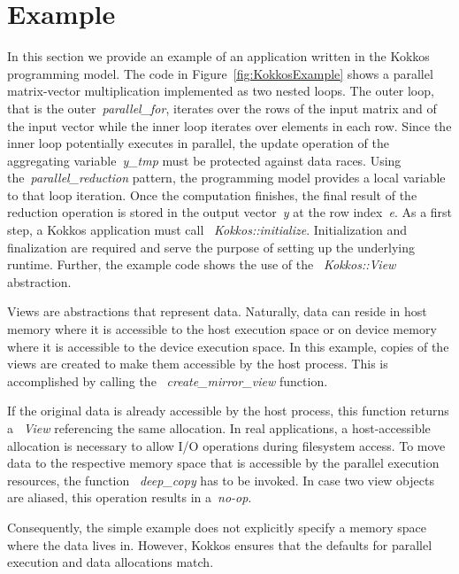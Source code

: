 \section{Example}\label{chap:kokkosExample}

In this section we provide an example of an application written in the Kokkos programming model. The code in Figure~\ref{fig:KokkosExample} shows a parallel matrix-vector multiplication implemented as two nested loops. The outer loop, that is the outer~\emph{parallel\_for}, iterates over the rows of the input matrix and of the input vector while the inner loop iterates over elements in each row. Since the inner loop potentially executes in parallel, the update operation of the aggregating variable~\emph{y\_tmp} must be protected against data races. Using the~\emph{parallel\_reduction} pattern, the programming model provides a local variable to that loop iteration. Once the computation finishes, the final result of the reduction operation is stored in the output vector~\emph{y} at the row index~\emph{e}.  
As a first step, a Kokkos application must call ~\emph{Kokkos::initialize}. Initialization and finalization are required and serve the purpose of setting up the underlying runtime. 
Further, the example code shows the use of the ~\emph{Kokkos::View} abstraction. 

Views are abstractions that represent data. Naturally, data can reside in host memory where it is accessible to the host execution space or on device memory where it is accessible to the device execution space. In this example, copies of the views are created to make them accessible by the host process. This is accomplished by calling the ~\emph{create\_mirror\_view} function. 

If the original data is already accessible by the host process, this function returns a ~\emph{View} referencing the same allocation. In real applications, a host-accessible allocation is necessary to allow I/O operations during filesystem access. To move data to the respective memory space that is accessible by the parallel execution resources, the function ~\emph{deep\_copy} has to be invoked. In case two view objects are aliased, this operation results in a~\emph{no-op}. 

Consequently, the simple example does not explicitly specify a memory space where the data lives in. However, Kokkos ensures that the defaults for parallel execution and data allocations match. 


